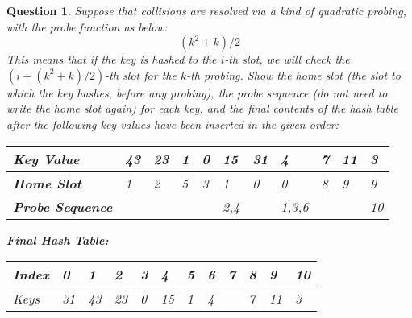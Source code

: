 \documentclass{article}
\newtheorem{Q}{Question}
\begin{document}
\begin{Q}
	Suppose that collisions are resolved via a kind of quadratic probing, with the probe function as below:
	$$(k^2+k)/2$$
	This means that if the key is hashed to the $i$-th slot, we will check the $(i+(k^2+k)/2)$-th slot for the $k$-th probing. Show the home slot (the slot to which the key hashes, before any probing), the probe sequence (do not need to write the home slot again) for each key, and the final contents of the hash table after the following key values have been inserted in the given order:
	\begin{table}[ht]
		\begin{tabular}{|p{1.7cm}|p{1cm}|p{1cm}|p{1cm}|p{1cm}|p{1cm}|p{1cm}|p{1cm}|p{1cm}|p{1cm}|p{1cm}|}
			\hline
			\textbf{Key Value}      & 43 & 23 & 1 & 0 & 15  & 31 & 4     & 7 & 11 & 3  \\ \hline
			\textbf{Home Slot}      & 1  & 2  & 5 & 3 & 1   & 0  & 0     & 8 & 9  & 9  \\ \hline
			\textbf{Probe Sequence} &    &    &   &   & 2,4 &    & 1,3,6 &   &    & 10 \\ \hline
		\end{tabular}
	\end{table}

	\textbf{Final Hash Table:}
	\begin{table}[ht]
		\begin{tabular}{|l|p{1cm}|p{1cm}|p{1cm}|p{1cm}|p{1cm}|p{1cm}|p{1cm}|p{1cm}|p{1cm}|p{1cm}|p{1cm}|}
			\hline
			Index & 0  & 1  & 2  & 3 & 4  & 5 & 6 & 7 & 8 & 9  & 10 \\ \hline
			Keys  & 31 & 43 & 23 & 0 & 15 & 1 & 4 &   & 7 & 11 & 3  \\ \hline
		\end{tabular}
	\end{table}
\end{Q}
\end{document}
